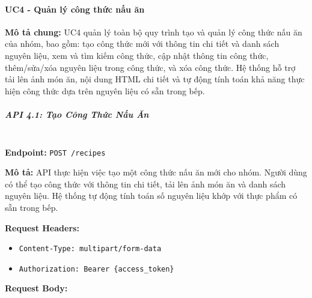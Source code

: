 \paragraph{UC4 - Quản lý công thức nấu ăn}

\textbf{Mô tả chung:} UC4 quản lý toàn bộ quy trình tạo và quản lý công thức nấu ăn của nhóm, bao gồm: tạo công thức mới với thông tin chi tiết và danh sách nguyên liệu, xem và tìm kiếm công thức, cập nhật thông tin công thức, thêm/sửa/xóa nguyên liệu trong công thức, và xóa công thức. Hệ thống hỗ trợ tải lên ảnh món ăn, nội dung HTML chi tiết và tự động tính toán khả năng thực hiện công thức dựa trên nguyên liệu có sẵn trong bếp.

\subparagraph{API 4.1: Tạo Công Thức Nấu Ăn}~\\

\textbf{Endpoint:} \texttt{POST /recipes}

\textbf{Mô tả:} API thực hiện việc tạo một công thức nấu ăn mới cho nhóm. Người dùng có thể tạo công thức với thông tin chi tiết, tải lên ảnh món ăn và danh sách nguyên liệu. Hệ thống tự động tính toán số nguyên liệu khớp với thực phẩm có sẵn trong bếp.

\textbf{Request Headers:}
\begin{itemize}
    \item \texttt{Content-Type: multipart/form-data}
    \item \texttt{Authorization: Bearer \{access\_token\}}
\end{itemize}

\textbf{Request Body:}

